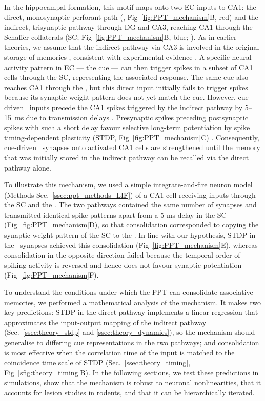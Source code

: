 In the hippocampal formation, this motif maps onto two EC inputs to CA1: the direct,
monosynaptic perforant path (\ppca, Fig~\ref{fig:PPT_mechanism}B, red) and the indirect,
trisynaptic pathway through DG and CA3, reaching CA1 through the Schaffer collaterals
(SC; Fig~\ref{fig:PPT_mechanism}B, blue; \cite{Amaral1993}). As in earlier theories, we
assume that the indirect pathway via CA3 is involved in the original storage of memories
\cite{Marr1969, Treves1994}, consistent with experimental evidence \cite{Brun2002,
Nakazawa2003, Nakashiba2008}. A specific neural activity pattern in EC --- the cue --- can
then trigger spikes in a subset of CA1 cells through the SC, representing the associated
response. The same cue also reaches CA1 through the \ppca, but this direct input initially
fails to trigger spikes because its synaptic weight pattern does not yet match the cue.
However, cue-driven \ppca~inputs precede the CA1 spikes triggered by the indirect pathway
by 5--15~ms due to transmission delays \cite{Yeckel1990}. Presynaptic spikes preceding
postsynaptic spikes with such a short delay favour selective long-term potentiation by
spike timing-dependent plasticity (STDP, Fig~\ref{fig:PPT_mechanism}C) \cite{Bi1998,
Markram1997, Gerstner1996}. Consequently, cue-driven \ppca~synapses onto activated CA1
cells are strengthened until the memory that was initially stored in the indirect pathway
can be recalled via the direct pathway alone.

To illustrate this mechanism, we used a simple integrate-and-fire neuron model
(Methods Sec.~\ref{ssec:ppt_methods_LIF}) of a CA1 cell receiving inputs through the SC
and the \ppca. The two pathways contained the same number of synapses and transmitted
identical spike patterns apart from a 5-ms delay in the SC (Fig~\ref{fig:PPT_mechanism}D),
so that consolidation corresponded to copying the synaptic weight pattern of the SC to the
\ppca. In line with our hypothesis, STDP in the \ppca~synapses achieved this consolidation
(Fig~\ref{fig:PPT_mechanism}E), whereas consolidation in the opposite direction failed
because the temporal order of spiking activity is reversed and hence does not favour
synaptic potentiation (Fig~\ref{fig:PPT_mechanism}F).

To understand the conditions under which the PPT can consolidate associative memories, we
performed a mathematical analysis of the mechanism. It makes two key predictions: STDP in
the direct pathway implements a linear regression that approximates the input-output
mapping of the indirect pathway (Sec.~\ref{ssec:theory_stdp} and
\ref{ssec:theory_dynamics}), so the mechanism should generalise to differing cue
representations in the two pathways; and consolidation is most effective when the
correlation time of the input is matched to the coincidence time scale of STDP
(Sec.~\ref{ssec:theory_timing}, Fig~\ref{sfig:theory_timing}B). In the following sections,
we test these predictions in simulations, show that the mechanism is robust to neuronal
nonlinearities, that it accounts for lesion studies in rodents, and that it can be
hierarchically iterated.
